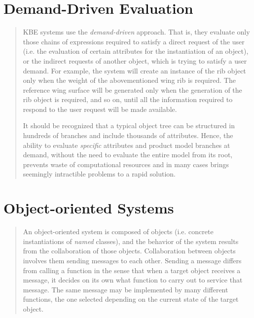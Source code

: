 \documentclass [11pt]{book}
\begin{document}
\section{Demand-Driven Evaluation}

\label{sec:demand-drivenevaluation}



\begin{quote}
KBE systems use the \emph{demand-driven} approach. That is, they evaluate only those chains of
expressions required to satisfy a direct request of the user (i.e. the
evaluation of certain attributes for the instantiation of an object),
or the indirect requests of another object, which is trying to satisfy
a user demand. For example, the system will create an instance of the
rib object only when the weight of the abovementioned wing rib is
required. The reference wing surface will be generated only when the
generation of the rib object is required, and so on, until all the
information required to respond to the user request will be made
available.

It should be recognized that a typical object tree can be structured
in hundreds of branches and include thousands of attributes. Hence,
the ability to evaluate \emph{specific} attributes and product model branches at demand, without the
need to evaluate the entire model from its root, prevents waste of
computational resources and in many cases brings seemingly intractible
problems to a rapid solution.

\end{quote}


\section{Object-oriented Systems}

\label{sec:object-orientedsystems}



\begin{quote}
An object-oriented system is composed of
       objects (i.e. concrete instantiations of \emph{named} classes), and the behavior of the system results from
       the collaboration of those objects. Collaboration between
       objects involves them sending messages to each other. Sending a
       message differs from calling a function in the sense that when
       a target object receives a message, it decides on its own what
       function to carry out to service that message. The same message
       may be implemented by many different functions, the one
       selected depending on the current state of the target
       object.

\end{quote}
\end{document}
